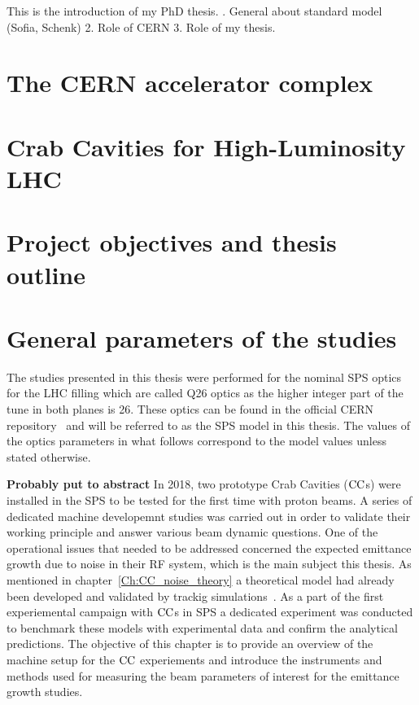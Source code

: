 This is the introduction of my PhD thesis.
. General about standard model (Sofia, Schenk)
2. Role of CERN
3. Role of my thesis.

\section{The CERN accelerator complex}



 


\section{Crab Cavities for High-Luminosity LHC}


\section{Project objectives and thesis outline}

\section{General parameters of the studies}
 The studies presented in this thesis were performed for the nominal SPS optics for the LHC filling which are called Q26 optics as the higher integer part of the tune in both planes is 26. These optics can be found in the official CERN repository~\cite{SPS_optics_repo} and will be referred to as the SPS model in this thesis. The values of the optics parameters in what follows correspond to the model values unless stated otherwise.



\textbf{Probably put to abstract}
In 2018, two prototype Crab Cavities (${\mathrm{CC}}$s) were installed in the SPS to be tested for the first time with proton beams. A series of dedicated machine developemnt studies was carried out in order to validate their working principle and answer various beam dynamic questions. One of the operational issues that needed to be addressed concerned the expected emittance growth due to noise in their RF system, which is the main subject this thesis.  As mentioned in chapter~\ref{Ch:CC_noise_theory} a theoretical model had already been developed and validated by trackig simulations~\cite{PhysRevSTAB.18.101001}. 
As a part of the first experiemental campaign with ${\mathrm{CC}}$s in SPS a dedicated experiment was conducted to benchmark these models with experimental data and confirm the analytical predictions. The objective of this chapter is to provide an overview of the machine setup for the ${\mathrm{CC}}$ experiements and introduce the instruments and methods used for measuring the beam parameters of interest for the emittance growth studies.